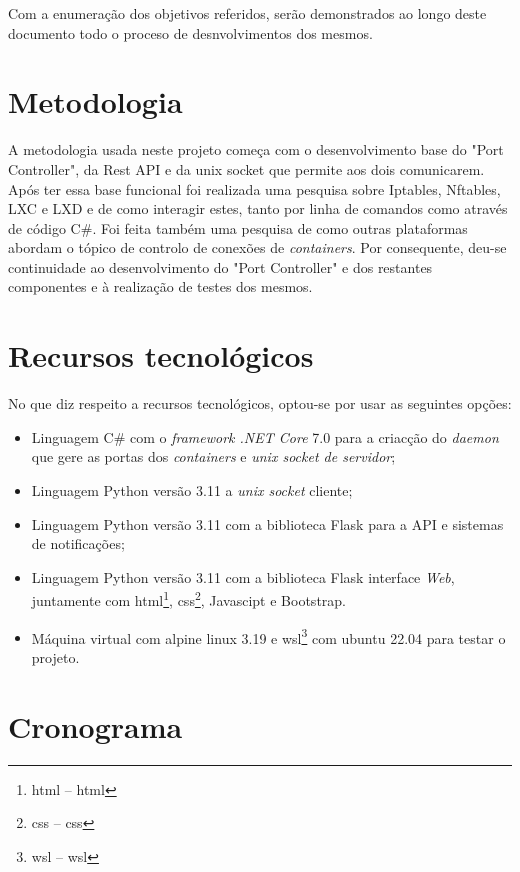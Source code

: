 Com a enumeração dos objetivos referidos, serão demonstrados ao longo deste documento
todo o proceso de desnvolvimentos dos mesmos.




\section{Metodologia}
\label{sec:intro_method}

A metodologia usada neste projeto começa com o desenvolvimento base do "Port Controller",
da Rest API e da unix socket que permite aos dois comunicarem. Após ter essa base funcional
foi realizada uma pesquisa sobre Iptables, Nftables, LXC e LXD e de como interagir estes, tanto
por linha de comandos como através de código C\#. Foi feita também uma pesquisa de como
outras plataformas abordam o tópico de controlo de conexões de \textit{containers}.
Por consequente, deu-se continuidade ao desenvolvimento do "Port Controller" e dos 
restantes componentes e à realização de testes dos mesmos.


\section{Recursos tecnológicos}
\label{sec:intro_resources}


No que diz respeito a recursos tecnológicos, optou-se por usar as seguintes opções:

\begin{itemize}
\item Linguagem C\# com o \textit{framework .NET Core} 7.0 para a criacção do \textit{daemon} que gere
as portas dos \textit{containers} e \textit{unix socket de servidor};
\item Linguagem Python versão 3.11 a \textit{unix socket} cliente;
\item Linguagem Python versão 3.11 com a biblioteca Flask para a API e sistemas de notificações;
\item Linguagem Python versão 3.11 com a biblioteca Flask interface \textit{Web}, juntamente com \acrshort{html}\footnote{\acrshort{html} -- \acrlong{html}}, \acrshort{css}\footnote{\acrshort{css} -- \acrlong{css}}, Javascipt e Bootstrap.
\item Máquina virtual com alpine linux 3.19 e \acrshort{wsl}\footnote{\acrshort{wsl} -- \acrlong{wsl}} com ubuntu 22.04 para testar o projeto.
\end{itemize}




\section{Cronograma}
\label{sec:intro_chronos}

